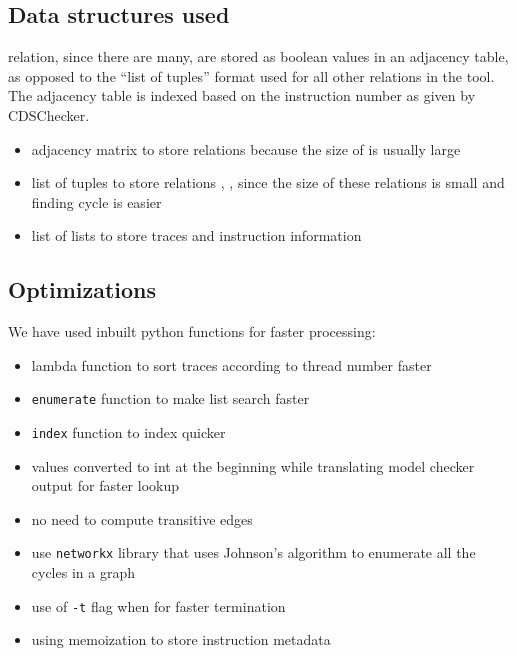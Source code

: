 \subsection{Data structures used}
\setHB relation, since there are many, are stored as boolean values in 
an adjacency table, as opposed to the ``list of tuples'' format used for 
all other relations in the tool. The adjacency table is indexed based 
on the instruction number as given by CDSChecker. 

\begin{itemize}
	\item adjacency matrix to store \setHB relations because the size 
	of \setHB is usually large
	\item list of tuples to store relations \setMO, \setSB, \setTO
	since the size of these relations is small and finding cycle is
	easier
	\item list of lists to store traces and instruction information
\end{itemize}

\subsection{Optimizations}
We have used inbuilt python functions for faster processing:
\begin{itemize}
	\item lambda function to sort traces according to thread number faster
	\item \texttt{enumerate} function to make list search faster
	\item \texttt{index} function to index quicker
	\item values converted to int at the beginning while translating 
	model checker output for faster lookup
	\item no need to compute transitive \setTO edges
	\item use \texttt{networkx} library that uses Johnson's 
	algorithm to enumerate all the cycles in a graph
	\item use of \texttt{-t} flag when for faster termination
	\item using memoization to store instruction metadata
\end{itemize}

